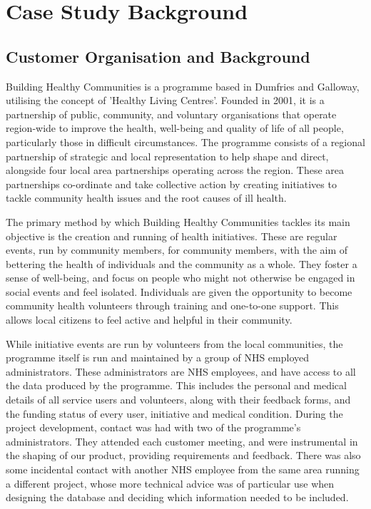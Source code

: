 \documentclass{l3proj}
\begin{document}
\section{Case Study Background}

\subsection{Customer Organisation and Background}
\label{customer}

Building Healthy Communities is a programme based in Dumfries and Galloway, utilising the concept of 'Healthy Living Centres'. Founded in 2001, it is a partnership of public, community, and voluntary organisations that operate region-wide to improve the health, well-being and quality of life of all people, particularly those in difficult circumstances. The programme consists of a regional partnership of strategic and local representation to help shape and direct, alongside four local area partnerships operating across the region. These area partnerships co-ordinate and take collective action by creating initiatives to tackle community health issues and the root causes of ill health.

The primary method by which Building Healthy Communities tackles its main objective is the creation and running of health initiatives. These are regular events, run by community members, for community members, with the aim of bettering the health of individuals and the community as a whole. They foster a sense of well-being, and focus on people who might not otherwise be engaged in social events and feel isolated. Individuals are given the opportunity to become community health volunteers through training and one-to-one support. This allows local citizens to feel active and helpful in their community.

While initiative events are run by volunteers from the local communities, the programme itself is run and maintained by a group of NHS employed administrators. These administrators are NHS employees, and have access to all the data produced by the programme. This includes the personal and medical details of all service users and volunteers, along with their feedback forms, and the funding status of every user, initiative and medical condition. During the project development, contact was had with two of the programme's administrators. They attended each customer meeting, and were instrumental in the shaping of our product, providing requirements and feedback. There was also some incidental contact with another NHS employee from the same area running a different project, whose more technical advice was of particular use when designing the database and deciding which information needed to be included.
\end{document}
